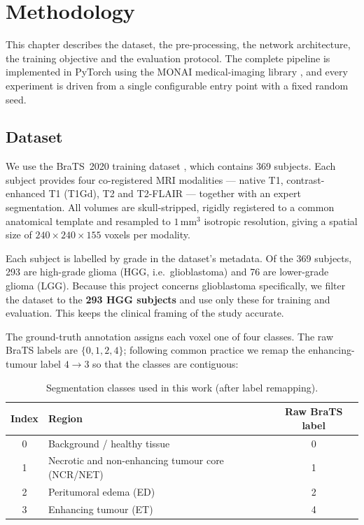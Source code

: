 \chapter{Methodology}
\label{ch:method}

This chapter describes the dataset, the pre-processing, the network architecture,
the training objective and the evaluation protocol. The complete pipeline is
implemented in PyTorch \citep{paszke2019pytorch} using the MONAI medical-imaging
library \citep{cardoso2022monai}, and every experiment is driven from a single
configurable entry point with a fixed random seed.

\section{Dataset}
\label{sec:data}

We use the BraTS~2020 training dataset \citep{menze2015brats,bakas2017advancing},
which contains 369 subjects. Each subject provides four co-registered MRI
modalities --- native T1, contrast-enhanced T1 (T1Gd), T2 and T2-FLAIR --- together
with an expert segmentation. All volumes are skull-stripped, rigidly registered to
a common anatomical template and resampled to $1\,\mathrm{mm}^3$ isotropic
resolution, giving a spatial size of $240\times240\times155$ voxels per modality.

Each subject is labelled by grade in the dataset's metadata. Of the 369 subjects,
293 are high-grade glioma (HGG, i.e.\ glioblastoma) and 76 are lower-grade glioma
(LGG). Because this project concerns glioblastoma specifically, we filter the
dataset to the \textbf{293 HGG subjects} and use only these for training and
evaluation. This keeps the clinical framing of the study accurate.

The ground-truth annotation assigns each voxel one of four classes. The raw BraTS
labels are $\{0,1,2,4\}$; following common practice we remap the enhancing-tumour
label $4\rightarrow 3$ so that the classes are contiguous:

\begin{table}[h]
\centering
\caption{Segmentation classes used in this work (after label remapping).}
\label{tab:classes}
\begin{tabular}{@{}clc@{}}
\toprule
Index & Region & Raw BraTS label \\
\midrule
0 & Background / healthy tissue & 0 \\
1 & Necrotic and non-enhancing tumour core (NCR/NET) & 1 \\
2 & Peritumoral edema (ED) & 2 \\
3 & Enhancing tumour (ET) & 4 \\
\bottomrule
\end{tabular}
\end{table}

